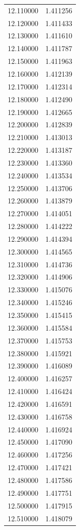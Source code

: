 \begin{tabular}{rr}
12.110000 & 1.411256 \\
12.120000 & 1.411433 \\
12.130000 & 1.411610 \\
12.140000 & 1.411787 \\
12.150000 & 1.411963 \\
12.160000 & 1.412139 \\
12.170000 & 1.412314 \\
12.180000 & 1.412490 \\
12.190000 & 1.412665 \\
12.200000 & 1.412839 \\
12.210000 & 1.413013 \\
12.220000 & 1.413187 \\
12.230000 & 1.413360 \\
12.240000 & 1.413534 \\
12.250000 & 1.413706 \\
12.260000 & 1.413879 \\
12.270000 & 1.414051 \\
12.280000 & 1.414222 \\
12.290000 & 1.414394 \\
12.300000 & 1.414565 \\
12.310000 & 1.414736 \\
12.320000 & 1.414906 \\
12.330000 & 1.415076 \\
12.340000 & 1.415246 \\
12.350000 & 1.415415 \\
12.360000 & 1.415584 \\
12.370000 & 1.415753 \\
12.380000 & 1.415921 \\
12.390000 & 1.416089 \\
12.400000 & 1.416257 \\
12.410000 & 1.416424 \\
12.420000 & 1.416591 \\
12.430000 & 1.416758 \\
12.440000 & 1.416924 \\
12.450000 & 1.417090 \\
12.460000 & 1.417256 \\
12.470000 & 1.417421 \\
12.480000 & 1.417586 \\
12.490000 & 1.417751 \\
12.500000 & 1.417915 \\
12.510000 & 1.418079 \\

\end{tabular}
